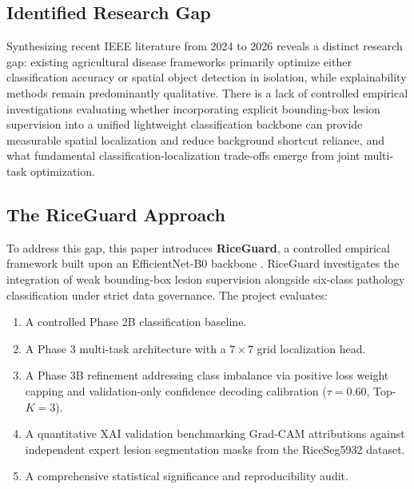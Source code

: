 \subsection{Identified Research Gap}
Synthesizing recent IEEE literature from 2024 to 2026 reveals a distinct research gap: existing agricultural disease frameworks primarily optimize either classification accuracy or spatial object detection in isolation, while explainability methods remain predominantly qualitative. There is a lack of controlled empirical investigations evaluating whether incorporating explicit bounding-box lesion supervision into a unified lightweight classification backbone can provide measurable spatial localization and reduce background shortcut reliance, and what fundamental classification-localization trade-offs emerge from joint multi-task optimization.

\subsection{The RiceGuard Approach}
To address this gap, this paper introduces \textbf{RiceGuard}, a controlled empirical framework built upon an EfficientNet-B0 backbone \cite{ref15}. RiceGuard investigates the integration of weak bounding-box lesion supervision alongside six-class pathology classification under strict data governance. The project evaluates:
\begin{enumerate}
    \item A controlled Phase 2B classification baseline.
    \item A Phase 3 multi-task architecture with a $7\times 7$ grid localization head.
    \item A Phase 3B refinement addressing class imbalance via positive loss weight capping and validation-only confidence decoding calibration ($\tau = 0.60$, Top-$K = 3$).
    \item A quantitative XAI validation benchmarking Grad-CAM attributions against independent expert lesion segmentation masks from the RiceSeg5932 dataset.
    \item A comprehensive statistical significance and reproducibility audit.
\end{enumerate}

